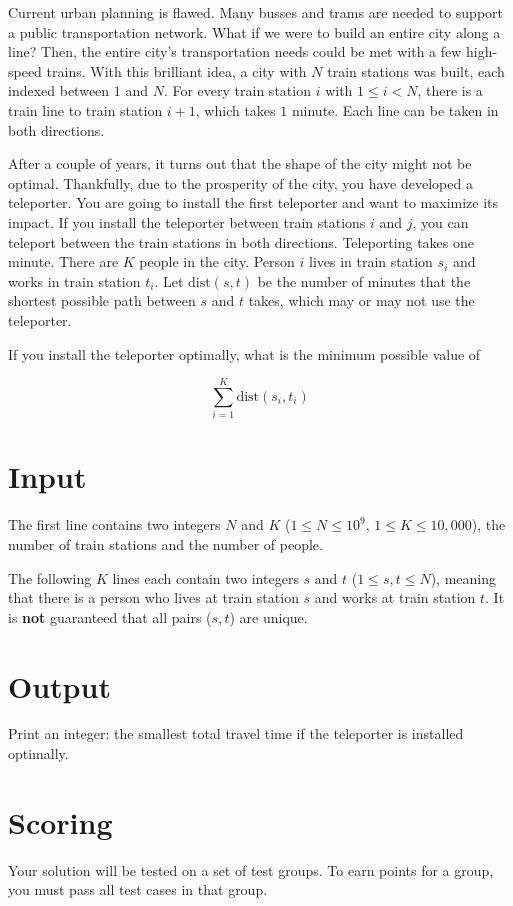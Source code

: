 
Current urban planning is flawed.
Many busses and trams are needed to support a public transportation network.
What if we were to build an entire city along a line?
Then, the entire city's transportation needs could be met with a few high-speed trains.
With this brilliant idea, a city with $N$ train stations was built, each indexed between $1$ and $N$.
For every train station $i$ with $1 \leq i < N$, there is a train line to train station $i+1$, which takes $1$ minute.
Each line can be taken in both directions.

After a couple of years, it turns out that the shape of the city might not be optimal.
Thankfully, due to the prosperity of the city, you have developed a teleporter.
You are going to install the first teleporter and want to maximize its impact.
If you install the teleporter between train stations $i$ and $j$, you can teleport between the train stations in both directions.
Teleporting takes one minute.
There are $K$ people in the city.
Person $i$ lives in train station $s_i$ and works in train station $t_i$.
Let $\text{dist}(s,t)$ be the number of minutes that the shortest possible path between $s$ and $t$ takes,
which may or may not use the teleporter.

If you install the teleporter optimally, what is the minimum possible value of

$$\sum_{i=1}^{K} \text{dist}(s_i, t_i)$$

\section*{Input}

The first line contains two integers $N$ and $K$ ($1 \leq N \leq 10^9$, $1 \leq K \leq 10{,}000$),
the number of train stations and the number of people.

The following $K$ lines each contain two integers $s$ and $t$ ($1 \leq s,t \leq N$),
meaning that there is a person who lives at train station $s$ and works at train station $t$.
It is \textbf{not} guaranteed that all pairs ($s,t$) are unique.

\section*{Output}
Print an integer: the smallest total travel time if the teleporter is installed optimally.

\section*{Scoring}
Your solution will be tested on a set of test groups.
To earn points for a group, you must pass all test cases in that group.

